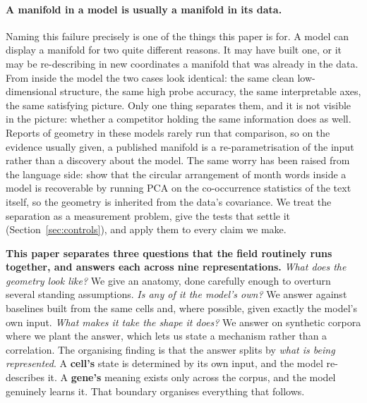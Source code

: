 \documentclass[11pt]{article}
\begin{document}
\paragraph{A manifold in a model is usually a manifold in its data.} Naming this failure precisely is
one of the things this paper is for. A model can display a manifold for two quite different reasons. It
may have built one, or it may be re-describing in new coordinates a manifold that was already in the
data. From inside the model the two cases look identical: the same clean low-dimensional structure, the
same high probe accuracy, the same interpretable axes, the same satisfying picture. Only one thing
separates them, and it is not visible in the picture: whether a competitor holding the same information
does as well. Reports of geometry in these models rarely run that comparison, so on
the evidence usually given, a published manifold is a re-parametrisation of the input rather than a
discovery about the model. The same worry has been raised from the language side:
\citet{prieto2026correlations} show that the circular arrangement of month words inside a model is
recoverable by running PCA on the co-occurrence statistics of the text itself, so the geometry is
inherited from the data's covariance. We treat the separation as a measurement problem, give the tests
that settle it (Section~\ref{sec:controls}), and apply them to every claim we make.

\textbf{This paper separates three questions that the field routinely runs together, and answers each
across nine representations.} \emph{What does the geometry look like?} We give an anatomy, done
carefully enough to overturn several standing assumptions. \emph{Is any of it the model's own?} We
answer against baselines built from the same cells and, where possible, given exactly the model's own
input. \emph{What makes it take the shape it does?} We answer on synthetic corpora where we plant the
answer, which lets us state a mechanism rather than a correlation. The organising finding is that the
answer splits by \emph{what is being represented}. A \textbf{cell's} state is determined by its own
input, and the model re-describes it. A \textbf{gene's} meaning exists only across the corpus, and the
model genuinely learns it. That boundary organises everything that follows.
\end{document}
